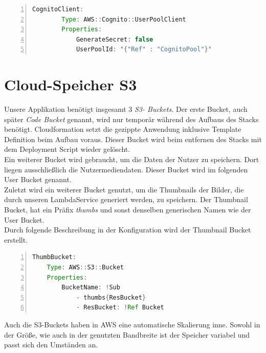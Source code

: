 \documentclass[a4paper, 12pt]{scrreprt}
\renewcommand\_{\textunderscore\allowbreak}
\begin{document}
\begin{lstlisting}[xleftmargin=\parindent,numbers=left,numberstyle=\small,numbersep=8pt,frame=L,mathescape=true, basicstyle=\small, language=Java, lineskip={1.0pt}]
    CognitoClient:
        Type: AWS::Cognito::UserPoolClient
        Properties:
            GenerateSecret: false
            UserPoolId: '{"Ref" : "CognitoPool"}'
\end{lstlisting} 

\section{Cloud-Speicher S3}
Unsere Applikation benötigt insgesamt 3\textit{ S3- Buckets.} Der erste Bucket, auch später \textit{Code Bucket} genannt, wird nur temporär während des Aufbaus des Stacks benötigt. Cloudformation setzt die gezippte Anwendung inklusive Template Definition beim Aufbau voraus. Dieser Bucket wird beim entfernen des Stacks mit dem Deployment Script wieder gelöscht. \\
Ein weiterer Bucket wird gebraucht, um die Daten der Nutzer zu speichern. Dort liegen ausschließlich die Nutzermediendaten. Dieser Bucket wird im folgenden User Bucket genannt. \\
Zuletzt wird ein weiterer Bucket genutzt, um die Thumbnails der Bilder, die durch unseren LambdaService generiert werden, zu speichern. Der Thumbnail Bucket, hat ein Präfix \textit{thumbs} und sonst denselben generischen Namen wie der User Bucket. \\
Durch folgende Beschreibung in der Konfiguration wird der Thumbnail Bucket erstellt.
\begin{lstlisting}[xleftmargin=\parindent,numbers=left,numberstyle=\small,numbersep=8pt,frame=L,mathescape=true, basicstyle=\small, language=Java, lineskip={1.0pt}]
ThumbBucket:
    Type: AWS::S3::Bucket
    Properties:
        BucketName: !Sub
            - thumbs{ResBucket}
            - ResBucket: !Ref Bucket
\end{lstlisting}          
Auch die S3-Buckets haben in AWS eine automatische Skalierung inne. Sowohl in der Größe, wie auch in der genutzten Bandbreite ist der Speicher variabel und passt sich den Umständen an.
\end{document}
